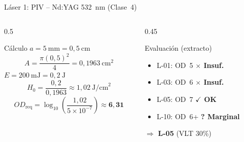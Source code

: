 \documentclass[aspectratio=169,12pt]{beamer}
\begin{document}
\begin{frame}{Láser 1: PIV -- Nd:YAG 532~nm (Clase~4)}
	\begin{columns}
		\begin{column}{0.5\textwidth}
			\begin{block}{Cálculo}
				$a = 5~\text{mm} = 0{,}5~\text{cm}$
				\[A = \frac{\pi (0{,}5)^2}{4} = 0{,}1963~\text{cm}^2\]
				$E = 200~\text{mJ} = 0{,}2~\text{J}$
				\[H_0 = \frac{0{,}2}{0{,}1963} \approx 1{,}02~\text{J/cm}^2\]
				\[OD_\mathrm{req} = \log_{10}\!\left(\frac{1{,}02}{5\times10^{-7}}\right) \approx \mathbf{6{,}31}\]
			\end{block}
		\end{column}
		\begin{column}{0.45\textwidth}
			\begin{alertblock}{Evaluación (extracto)}
				\begin{itemize}
					\item L-01: OD~5 \textcolor{aerored}{\textbf{$\times$ Insuf.}}
					\item L-03: OD~6 \textcolor{aerored}{\textbf{$\times$ Insuf.}}
					\item L-05: OD~7 \textcolor{aerogreen}{\textbf{$\checkmark$ OK}}
					\item L-10: OD~6+ \textcolor{aeroyellow}{\textbf{? Marginal}}
				\end{itemize}
			\end{alertblock}
			\vspace{0.2cm}
			$\Rightarrow$ \textbf{L-05} (VLT 30\%)
		\end{column}
	\end{columns}
\end{frame}
\end{document}
